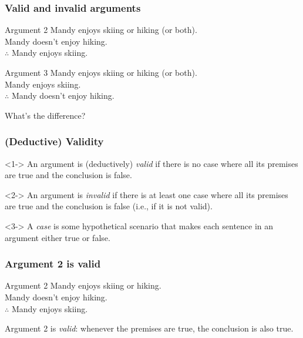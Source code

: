 \begin{frame}
  \frametitle{Valid and invalid arguments}

  \begin{block}{Argument 2}
  Mandy enjoys skiing or hiking (or both).\\
  Mandy doesn't enjoy hiking.\\
  $\therefore$ Mandy enjoys skiing.
  \end{block}

  \begin{block}{Argument 3}
  Mandy enjoys skiing or hiking (or both).\\
  Mandy enjoys skiing.\\
  $\therefore$ Mandy doesn't enjoy hiking.
  \end{block}

  What's the difference?

\end{frame}


\begin{frame}
  \frametitle{(Deductive) Validity}

  \begin{definition}<1->
  An argument is (deductively) \emph{valid} if there is no case where all its
  premises are true and the conclusion is false.
  \end{definition}

  \begin{definition}<2->
  An argument is \emph{invalid} if there is at least one case where
  all its premises are true and the conclusion is false (i.e., if it
  is not valid).
  \end{definition}

  \begin{definition}<3->
  A \emph{case} is some hypothetical scenario that makes each sentence
  in an argument either true or false.
  \end{definition}
\end{frame}

\begin{frame}
  \frametitle{Argument 2 is valid}

  \begin{block}{Argument 2}
  Mandy enjoys skiing or hiking.\\
  Mandy doesn't enjoy hiking.\\
  $\therefore$ Mandy enjoys skiing.
  \end{block}

Argument 2 is \emph{valid}: whenever the premises are
true, the conclusion is also true.

\end{frame}

